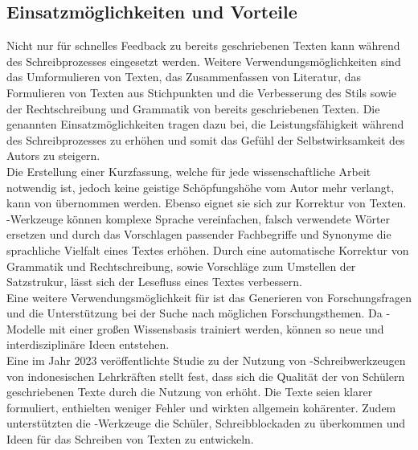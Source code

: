 \documentclass[../main.tex]{subfiles}
\begin{document}
\subsection{Einsatzmöglichkeiten und Vorteile}
\label{sec:vorteile}

Nicht nur für schnelles Feedback zu bereits geschriebenen Texten kann  während des Schreibprozesses eingesetzt werden. 
Weitere Verwendungsmöglichkeiten sind das Umformulieren von Texten, das Zusammenfassen von Literatur, das Formulieren von Texten aus Stichpunkten und die Verbesserung des Stils sowie der Rechtschreibung und Grammatik von bereits geschriebenen Texten. Die genannten Einsatzmöglichkeiten 
tragen dazu bei, die Leistungsfähigkeit während des Schreibprozesses zu erhöhen und somit das Gefühl der Selbstwirksamkeit des Autors zu steigern.\cite{SelfEfficacyBeliefs}\\
Die Erstellung einer Kurzfassung, welche für jede wissenschaftliche Arbeit notwendig ist, jedoch keine geistige Schöpfungshöhe vom Autor mehr verlangt, 
kann von  übernommen werden. Ebenso eignet sie sich zur Korrektur von Texten. -Werkzeuge können komplexe Sprache vereinfachen, falsch 
verwendete Wörter ersetzen und durch das Vorschlagen passender Fachbegriffe und Synonyme die sprachliche Vielfalt eines Textes erhöhen. Durch eine 
automatische Korrektur von Grammatik und Rechtschreibung, sowie Vorschläge zum Umstellen der Satzstrukur, lässt sich der Lesefluss eines Textes verbessern.\cite{ZukunftWissenschaftlichesPublizieren,teachers}\\
Eine weitere Verwendungsmöglichkeit für  ist das Generieren von Forschungsfragen und die Unterstützung bei der Suche nach möglichen Forschungsthemen. Da -Modelle mit einer großen Wissensbasis trainiert werden, 
können so neue und interdisziplinäre Ideen entstehen.\cite{ZukunftWissenschaftlichesPublizieren,humanWritingToAi}\\
Eine im Jahr 2023 veröffentlichte Studie zu der Nutzung von -Schreibwerkzeugen von indonesischen Lehrkräften stellt fest, dass sich die Qualität der von 
Schülern geschriebenen Texte durch die Nutzung von  erhöht. Die Texte seien klarer formuliert, enthielten weniger Fehler und 
wirkten allgemein kohärenter. Zudem unterstützten die -Werkzeuge die Schüler, Schreibblockaden zu überkommen und Ideen für das Schreiben von Texten zu entwickeln.\cite{teachers} 
\end{document}
